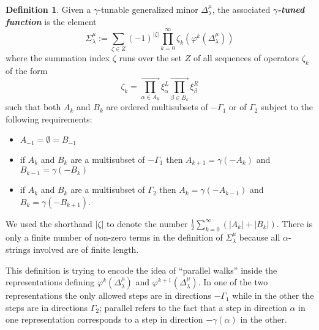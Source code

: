 \documentclass[a4paper]{amsart}
\theoremstyle{definition}
\newtheorem{definition}[theorem]{Definition}
\newcommand{\newword}[1]{\textbf{\emph{#1}}}
\begin{document}
\begin{definition}
  Given a $\gamma$-tunable generalized minor $\Delta_\lambda^\mu$, the associated \newword{$\gamma$-tuned function} is the element
  \[
    \Sigma_\lambda^\mu := \sum_{\zeta\in Z} (-1)^{|\zeta|} \prod_{k=0}^\infty \zeta_k\left(\varphi^k(\Delta_\lambda^\mu)\right)
  \]
  where the summation index $\zeta$ runs over the set $Z$ of all sequences of operators $\zeta_k$ of the form
  \[
    \zeta_k = \prod_{\alpha\in A_k}^\rightarrow  \xi^L_\alpha \prod_{\beta\in B_k}^\rightarrow \xi^R_\beta
  \] 
  such that both $A_k$ and $B_k$ are ordered multisubsets of $-\Gamma_1$ or of $\Gamma_2$ subject to the following requirements:
  \begin{itemize}
    \item 
      $A_{-1} = \emptyset = B_{-1} $
    \item
      if $A_k$ and $B_k$ are a multisubset of $-\Gamma_1$ then $A_{k+1} = \gamma(-A_k)$ and $B_{k-1} = \gamma(-B_k)$
    \item
      if $A_k$ and $B_k$ are a multisubset of $\Gamma_2$ then $A_k = \gamma(-A_{k-1})$ and $B_k = \gamma(-B_{k+1})$.
  \end{itemize}
  We used the shorthand $|\zeta|$ to denote the number $\frac{1}{2}\sum_{k=0}^\infty (|A_k|+|B_k|)$.
  There is only a finite number of non-zero terms in the definition of $\Sigma_\lambda^\mu$ because all $\alpha$-strings involved are of finite length.
\end{definition}

This definition is trying to encode the idea of ``parallel walks'' inside the representations defining $\varphi^k(\Delta_\lambda^\mu)$ and $\varphi^{k+1}(\Delta_\lambda^\mu)$.
In one of the two representations the only allowed steps are in directions $-\Gamma_1$ while in the other the steps are in directions $\Gamma_2$; parallel refers to the fact that a step in direction $\alpha$ in one representation corresponds to a step in direction $-\gamma(\alpha)$ in the other.  
\end{document}
